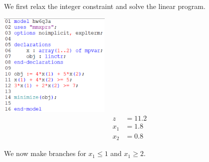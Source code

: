 \documentclass[12pt]{article}
\theoremstyle{definition}
\begin{document}
We first relax the integer constraint and solve the linear program.
\begin{center}
    \includegraphics[width=0.4\textwidth]{code3a.png}
    \begin{align*}
        z &= 11.2 \\
        x_1 &= 1.8 \\
        x_2 &= 0.8
    \end{align*}
\end{center}
We now make branches for $x_1 \leq 1$ and $x_1 \geq 2$.
\end{document}
